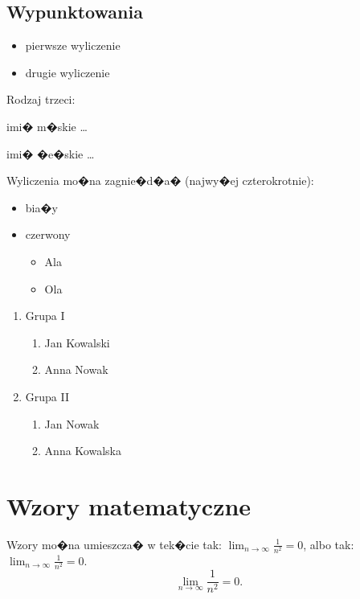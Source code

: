 \documentclass[11pt,wide]{mwart}
\begin{document}
\subsection{Wypunktowania}
\begin{itemize}
\itemsep 0pt
\item pierwsze wyliczenie
\item drugie wyliczenie
\end{itemize}

\noindent
Rodzaj trzeci:
\begin{description}
\itemsep 0pt
\item[Pawe�] imi� m�skie \ldots
\item[Justyna] imi� �e�skie \ldots
\end{description}

\noindent
Wyliczenia mo�na zagnie�d�a� (najwy�ej czterokrotnie):

\begin{itemize}
\itemsep 0pt
\item bia�y
\item czerwony
	\begin{itemize}
		\item Ala
		\item Ola
	\end{itemize}
\end{itemize}

\begin{enumerate}
	\itemsep 0pt
	\item Grupa I
	\begin{enumerate}
		\itemsep 0pt
		\item Jan Kowalski
		\item Anna Nowak
	\end{enumerate}
	\item Grupa II
	\begin{enumerate}
		\item Jan Nowak
		\item Anna Kowalska
	\end{enumerate}
\end{enumerate}

\section{Wzory matematyczne}\label{S:Wzory}

Wzory mo�na umieszcza� w tek�cie tak: $\lim_{n\rightarrow\infty}\frac{1}{n^2}=0$, albo tak: $\displaystyle\lim_{n\rightarrow\infty}\frac{1}{n^2}=0$.
$$
	\lim_{n\to\infty}\frac{1}{n^2}=0.
$$
\end{document}
